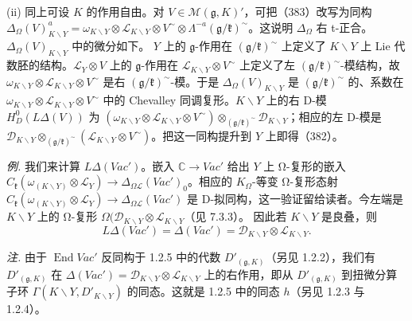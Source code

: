 (ii) 同上可设 $K$ 的作用自由。对 $V\in\mathcal{M}(\mathfrak{g},K)'$，可把（383）改写为同构 $\Delta_{\Omega}(V)^{a}_{K\backslash Y}=\omega_{K\backslash Y}\otimes\mathcal{L}_{K\backslash Y}\otimes V^{\sim}\otimes\Lambda^{-a}(\mathfrak{g}/\mathfrak{k})^{\sim}$。这说明 $\Delta_{\Omega}$ 右 t-正合。%
$\Delta_{\Omega}(V)_{K\backslash Y}$ 中的微分如下。%
$Y$ 上的 $\mathfrak{g}$-作用在 $(\mathfrak{g}/\mathfrak{k})^{\sim}$ 上定义了 $K\backslash Y$ 上 Lie 代数胚的结构。$\mathcal{L}_Y\otimes V$ 上的 $\mathfrak{g}$-作用在 $\mathcal{L}_{K\backslash Y}\otimes V^{\sim}$ 上定义了左 $(\mathfrak{g}/\mathfrak{k})^{\sim}$-模结构，故 $\omega_{K\backslash Y}\otimes\mathcal{L}_{K\backslash Y}\otimes V^{\sim}$ 是右 $(\mathfrak{g}/\mathfrak{k})^{\sim}$-模。于是 $\Delta_{\Omega}(V)_{K\backslash Y}$ 是 $(\mathfrak{g}/\mathfrak{k})^{\sim}$ 的、系数在 $\omega_{K\backslash Y}\otimes\mathcal{L}_{K\backslash Y}\otimes V^{\sim}$ 中的 Chevalley 同调复形。$K\backslash Y$ 上的右 D-模 $H^0_D(L\Delta(V))$ 为 $(\omega_{K\backslash Y}\otimes\mathcal{L}_{K\backslash Y}\otimes V^{\sim})\otimes_{(\mathfrak{g}/\mathfrak{k})^{\sim}}\mathcal{D}_{K\backslash Y}$；相应的左 D-模是 $\mathcal{D}_{K\backslash Y}\otimes_{(\mathfrak{g}/\mathfrak{k})^{\sim}}(\mathcal{L}_{K\backslash Y}\otimes V^{\sim})$。把这一同构提升到 $Y$ 上即得（382）。

 \emph{例.} 我们来计算 $L\Delta(Vac')$。嵌入 $\mathbb{C}\to Vac'$ 给出 $Y$ 上 Ω-复形的嵌入 $C_{\mathfrak{k}}(\omega_{(K\backslash Y)}\otimes\mathcal{L}_Y)\to\Delta_{\Omega\mathcal{L}}(Vac')_0$。相应的 $K_{\Omega}$-等变 Ω-复形态射 $C_{\mathfrak{k}}(\omega_{(K\backslash Y)}\otimes\mathcal{L}_Y)\to\Delta_{\Omega\mathcal{L}}(Vac')$ 是 D-拟同构，这一验证留给读者。今左端是 $K\backslash Y$ 上的 Ω-复形 $\Omega(\mathcal{D}_{K\backslash Y}\otimes\mathcal{L}_{K\backslash Y}$（见 7.3.3）。%
因此若 $K\backslash Y$ 是良叠，则
\[
L\Delta(Vac')=\Delta(Vac')=\mathcal{D}_{K\backslash Y}\otimes\mathcal{L}_{K\backslash Y}.
\]

\emph{注.} 由于 $\operatorname{End}Vac'$ 反同构于 1.2.5 中的代数 $D'_{(\mathfrak{g},K)}$（另见 1.2.2），我们有 $D'_{(\mathfrak{g},K)}$ 在 $\Delta(Vac')=\mathcal{D}_{K\backslash Y}\otimes\mathcal{L}_{K\backslash Y}$ 上的右作用，即从 $D'_{(\mathfrak{g},K)}$ 到扭微分算子环 $\Gamma(K\backslash Y,D'_{K\backslash Y})$ 的同态。这就是 1.2.5 中的同态 $h$（另见 1.2.3 与 1.2.4）。

